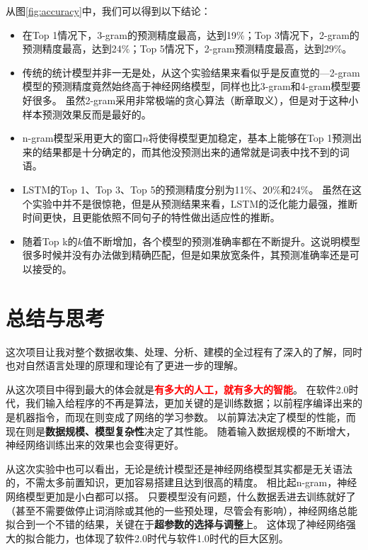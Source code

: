 \documentclass[logo,reportComp]{thesis}
\begin{document}
从图\ref{fig:accuracy}中，我们可以得到以下结论：
\begin{itemize}
\item 在Top 1情况下，3-gram的预测精度最高，达到19\%；Top 3情况下，2-gram的预测精度最高，达到24\%；Top 5情况下，2-gram预测精度最高，达到29\%。
\item 传统的统计模型并非一无是处，从这个实验结果来看似乎是反直觉的---2-gram模型的预测精度竟然始终高于神经网络模型，同样也比3-gram和4-gram模型要好很多。
虽然2-gram采用非常极端的贪心算法（断章取义），但是对于这种小样本预测效果反而是最好的。
\item n-gram模型采用更大的窗口$n$将使得模型更加稳定，基本上能够在Top 1预测出来的结果都是十分确定的，而其他没预测出来的通常就是词表中找不到的词语。
\item LSTM的Top 1、Top 3、Top 5的预测精度分别为11\%、20\%和24\%。
虽然在这个实验中并不是很惊艳，但是从预测结果来看，LSTM的泛化能力最强，推断时间更快，且更能依照不同句子的特性做出适应性的推断。
\item 随着Top k的$k$值不断增加，各个模型的预测准确率都在不断提升。这说明模型很多时候并没有办法做到精确匹配，但是如果放宽条件，其预测准确率还是可以接受的。
\end{itemize}

\section{总结与思考}
这次项目让我对整个数据收集、处理、分析、建模的全过程有了深入的了解，同时也对自然语言处理的原理和理论有了更进一步的理解。

从这次项目中得到最大的体会就是\textcolor{red}{\textbf{有多大的人工，就有多大的智能}}。
在软件2.0时代\cite{bib:software}，我们输入给程序的不再是算法，更加关键的是训练数据；以前程序编译出来的是机器指令，而现在则变成了网络的学习参数。
以前算法决定了模型的性能，而现在则是\textbf{数据规模、模型复杂性}决定了其性能。
随着输入数据规模的不断增大，神经网络训练出来的效果也会变得更好。

从这次实验中也可以看出，无论是统计模型还是神经网络模型其实都是无关语法的，不需太多前置知识，更加容易搭建且达到很高的精度。
相比起n-gram，神经网络模型更加是小白都可以搭。
只要模型没有问题，什么数据丢进去训练就好了（甚至不需要做停止词消除或其他的一些预处理，尽管会有影响），神经网络总能拟合到一个不错的结果，关键在于\textbf{超参数的选择与调整}上。
这体现了神经网络强大的拟合能力，也体现了软件2.0时代与软件1.0时代的巨大区别。
\end{document}
